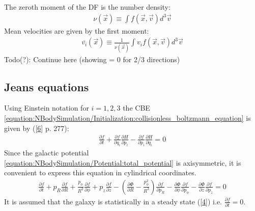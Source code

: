 \documentclass[letterpaper,10pt,english]{sphinxmanual}
\begin{document}
\sphinxAtStartPar
The zeroth moment of the DF is the number density:
\begin{equation*}
\begin{split}\nu(\vec{x}) \equiv \int f(\vec{x},\vec{v})d^3\vec{v}\end{split}
\end{equation*}
\sphinxAtStartPar
Mean velocities are given by the first moment:
\begin{equation*}
\begin{split}\overline{v_i}(\vec{x}) \equiv \frac{1}{\nu(\vec{x})}\int v_i f(\vec{x},\vec{v})d^3\vec{v}\end{split}
\end{equation*}
\sphinxAtStartPar
Todo(?): Continue here (showing = 0 for 2/3 directions)


\subsection{Jeans equations}
\label{\detokenize{NBodySimulation/Initialization:jeans-equations}}
\sphinxAtStartPar
Using Einstein notation for \(i=1,2,3\) the CBE \eqref{equation:NBodySimulation/Initialization:collisionless_boltzmann_equation} is given by ({[}\hyperlink{cite.NBodySimulation/Appendix:id17}{6}{]} p. 277):
\begin{equation*}
\begin{split}\frac{\partial f}{\partial t} + \frac{\partial f}{\partial q_i}\frac{\partial H}{\partial p_i} - \frac{\partial f}{\partial p_i}\frac{\partial H}{\partial q_i} = 0\end{split}
\end{equation*}
\sphinxAtStartPar
Since the galactic potential \eqref{equation:NBodySimulation/Potential:total_potential} is axisymmetric, it is convenient to express this equation in cylindrical coordinates.
\begin{equation}\label{equation:NBodySimulation/Initialization:jeans_equations_1}
\begin{split}\frac{\partial f}{\partial t}
 + p_R\frac{\partial f}{\partial R}
 + \frac{p_\phi}{R^2}\frac{\partial f}{\partial \phi}
 + p_z\frac{\partial f}{\partial z}
 - \left(\frac{\partial \Phi}{\partial R}-\frac{p_\phi^2}{R^3}\right)\frac{\partial f}{\partial p_R}
 - \frac{\partial \Phi}{\partial \phi}\frac{\partial f}{\partial p_\phi}
 - \frac{\partial \Phi}{\partial z}\frac{\partial f}{\partial p_z} = 0\end{split}
\end{equation}
\sphinxAtStartPar
It is assumed that the galaxy is statistically in a steady state ({[}\hyperlink{cite.NBodySimulation/Appendix:id18}{4}{]}) i.e. \(\frac{\partial f}{\partial t}=0\).
\end{document}

